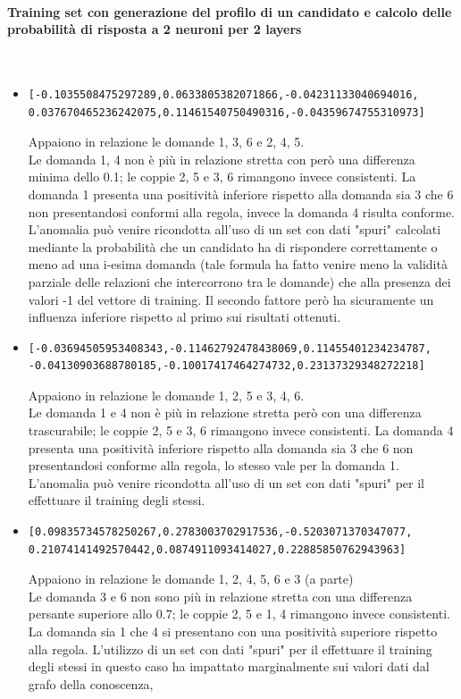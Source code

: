 \paragraph{Training set con generazione del profilo di un candidato e calcolo delle probabilit\`a di risposta a  2 neuroni per 2 layers}\mbox{}
\label{Training set con generazione del profilo di un candidato e calcolo delle probabilita di risposta a  2 neuroni}
\\
\noindent
\begin{itemize}
\item  \begin{verbatim}[-0.1035508475297289,0.0633805382071866,-0.04231133040694016,
0.037670465236242075,0.11461540750490316,-0.04359674755310973]\end{verbatim}
Appaiono in relazione le domande 1, 3, 6 e 2, 4, 5.\\
Le domanda 1, 4 non \`e pi\`u in relazione stretta con per\`o una differenza minima dello 0.1; le coppie 2, 5 e 3, 6 rimangono invece consistenti. La domanda 1 presenta una positivit\`a inferiore rispetto alla domanda sia 3 che 6 non presentandosi conformi alla regola, invece la domanda 4 risulta conforme. L'anomalia pu\`o venire ricondotta all'uso di un set con dati "spuri" calcolati mediante la probabilit\`a che un candidato ha di rispondere correttamente o meno ad una i-esima domanda (tale formula ha fatto venire meno la validit\`a parziale delle relazioni che intercorrono tra le domande) che alla presenza dei valori -1 del vettore di training. Il secondo fattore per\`o ha sicuramente un influenza inferiore rispetto al primo sui risultati ottenuti.

\item  \begin{verbatim}[-0.03694505953408343,-0.11462792478438069,0.11455401234234787,
-0.04130903688780185,-0.10017417464274732,0.23137329348272218]\end{verbatim}
Appaiono in relazione le domande 1, 2, 5 e 3, 4, 6.\\
Le domanda 1 e 4 non \`e pi\`u in relazione stretta per\`o con una differenza trascurabile; le coppie 2, 5 e 3, 6 rimangono invece consistenti. La domanda 4 presenta una positivit\`a inferiore rispetto alla domanda sia 3 che 6 non presentandosi conforme alla regola, lo stesso vale per la domanda 1. L'anomalia pu\`o venire ricondotta all'uso di un set con dati "spuri" per il effettuare il training degli stessi.

\item  \begin{verbatim}[0.09835734578250267,0.2783003702917536,-0.5203071370347077,
0.21074141492570442,0.0874911093414027,0.22885850762943963]\end{verbatim}
Appaiono in relazione le domande 1, 2, 4, 5, 6 e 3 (a parte)\\
Le domanda 3 e 6  non sono pi\`u in relazione stretta con una differenza persante superiore allo 0.7; le coppie 2, 5 e 1, 4 rimangono invece consistenti. La domanda sia 1 che 4 si presentano con una positivit\`a superiore rispetto alla regola. L'utilizzo di  un set con dati "spuri" per il effettuare il training degli stessi in questo caso ha impattato marginalmente sui valori dati dal grafo della conoscenza,


\end{itemize}
